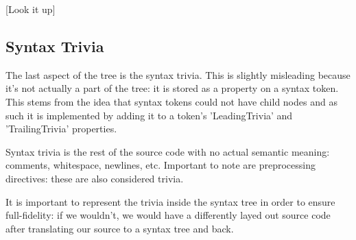 [Look it up]

\subsection{Syntax Trivia}
\label{sec:syntax-trivia}

The last aspect of the tree is the syntax trivia. This is slightly misleading because it's not actually a part of the tree: it is stored as a property on a syntax token. This stems from the idea that syntax tokens could not have child nodes and as such it is implemented by adding it to a token's 'LeadingTrivia' and 'TrailingTrivia' properties. 

Syntax trivia is the rest of the source code with no actual semantic meaning: comments, whitespace, newlines, etc. Important to note are preprocessing directives: these are also considered trivia.

It is important to represent the trivia inside the syntax tree in order to ensure full-fidelity: if we wouldn't, we would have a differently layed out source code after translating our source to a syntax tree and back.





